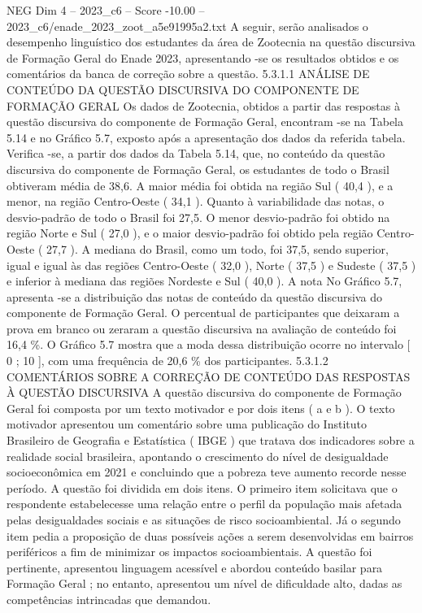 \begin{textsample}{NEG Dim 4 – 2023\_c6 – Score -10.00 – 2023\_c6/enade\_2023\_zoot\_a5e91995a2.txt}
A seguir, serão analisados o desempenho linguístico dos estudantes da área de Zootecnia na questão discursiva de Formação Geral do Enade 2023, apresentando -se os resultados obtidos e os comentários da banca de correção sobre a questão. 5.3.1.1 ANÁLISE DE CONTEÚDO DA QUESTÃO DISCURSIVA DO COMPONENTE DE FORMAÇÃO GERAL Os dados de Zootecnia, obtidos a partir das respostas à questão discursiva do componente de Formação Geral, encontram -se na Tabela 5.14 e no Gráfico 5.7, exposto após a apresentação dos dados da referida tabela.
Verifica -se, a partir dos dados da Tabela 5.14, que, no conteúdo da questão discursiva do componente de Formação Geral, os estudantes de todo o Brasil obtiveram média de 38,6.
A maior média foi obtida na região Sul ( 40,4 ), e a menor, na região Centro-Oeste ( 34,1 ).
Quanto à variabilidade das notas, o desvio-padrão de todo o Brasil foi 27,5.
O menor desvio-padrão foi obtido na região Norte e Sul ( 27,0 ), e o maior desvio-padrão foi obtido pela região Centro-Oeste ( 27,7 ).
A mediana do Brasil, como um todo, foi 37,5, sendo superior, igual e igual às das regiões Centro-Oeste ( 32,0 ), Norte ( 37,5 ) e Sudeste ( 37,5 ) e inferior à mediana das regiões Nordeste e Sul ( 40,0 ).
A nota No Gráfico 5.7, apresenta -se a distribuição das notas de conteúdo da questão discursiva do componente de Formação Geral.
O percentual de participantes que deixaram a prova em branco ou zeraram a questão discursiva na avaliação de conteúdo foi 16,4 \%.
O Gráfico 5.7 mostra que a moda dessa distribuição ocorre no intervalo [ 0 ; 10 ], com uma frequência de 20,6 \% dos participantes. 5.3.1.2 COMENTÁRIOS SOBRE A CORREÇÃO DE CONTEÚDO DAS RESPOSTAS À QUESTÃO DISCURSIVA A questão discursiva do componente de Formação Geral foi composta por um texto motivador e por dois itens ( a e b ).
O texto motivador apresentou um comentário sobre uma publicação do Instituto Brasileiro de Geografia e Estatística ( IBGE ) que tratava dos indicadores sobre a realidade social brasileira, apontando o crescimento do nível de desigualdade socioeconômica em 2021 e concluindo que a pobreza teve aumento recorde nesse período.
A questão foi dividida em dois itens.
O primeiro item solicitava que o respondente estabelecesse uma relação entre o perfil da população mais afetada pelas desigualdades sociais e as situações de risco socioambiental.
Já o segundo item pedia a proposição de duas possíveis ações a serem desenvolvidas em bairros periféricos a fim de minimizar os impactos socioambientais.
A questão foi pertinente, apresentou linguagem acessível e abordou conteúdo basilar para Formação Geral ; no entanto, apresentou um nível de dificuldade alto, dadas as competências intrincadas que demandou.

\end{textsample}
